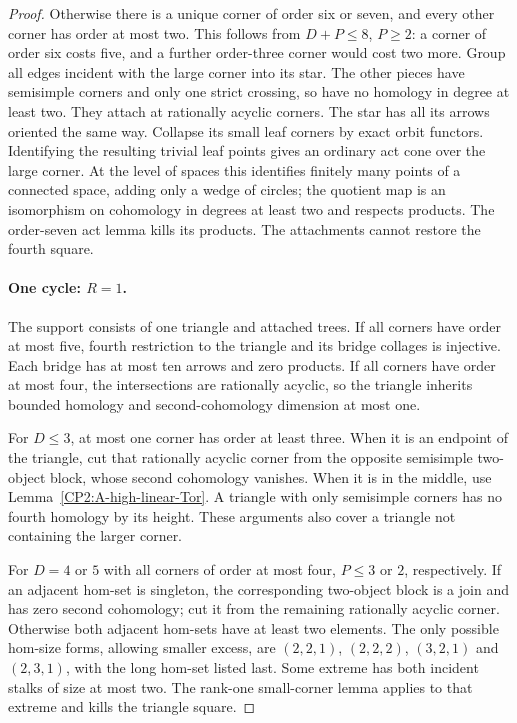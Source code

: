 \begin{proof}
Otherwise there is a unique corner of order six or seven,
and every other corner has order at most two.  This follows
from $D+P\leq8$, $P\geq2$: a corner of order six costs
five, and a further order-three corner would cost two more.
Group all edges incident with the large corner into its
star.  The other pieces have semisimple corners and only
one strict crossing, so have no homology in degree at
least two.  They attach at rationally acyclic corners.
The star has all its arrows oriented the same way.
Collapse its small leaf corners by exact orbit functors.
Identifying the resulting trivial leaf points gives an
ordinary act cone over the large corner.  At the level
of spaces this identifies finitely many points of a
connected space, adding only a wedge of circles; the
quotient map is an isomorphism on cohomology in degrees
at least two and respects products.  The order-seven
act lemma kills its products.  The attachments cannot
restore the fourth square.

\paragraph{One cycle: $R=1$.}
The support consists of one triangle and attached trees.
If all corners have order at most five, fourth restriction
to the triangle and its bridge collages is injective.
Each bridge has at most ten arrows and zero products.
If all corners have order at most four, the intersections
are rationally acyclic, so the triangle inherits bounded
homology and second-cohomology dimension at most one.

For $D\leq3$, at most one corner has order at least three.
When it is an endpoint of the triangle, cut that rationally
acyclic corner from the opposite semisimple two-object
block, whose second cohomology vanishes.  When it is in
the middle, use Lemma~\ref{CP2:A-high-linear-Tor}.
A triangle with only semisimple corners has no fourth
homology by its height.  These arguments also cover a
triangle not containing the larger corner.

For $D=4$ or $5$ with all corners of order at most four,
$P\leq3$ or $2$, respectively.  If an adjacent hom-set
is singleton, the corresponding two-object block is a
join and has zero second cohomology; cut it from the
remaining rationally acyclic corner.  Otherwise both
adjacent hom-sets have at least two elements.  The only
possible hom-size forms, allowing smaller excess, are
$(2,2,1)$, $(2,2,2)$, $(3,2,1)$ and $(2,3,1)$, with
the long hom-set listed last.  Some extreme has both
incident stalks of size at most two.  The rank-one
small-corner lemma applies to that extreme and kills
the triangle square.


\end{proof}
